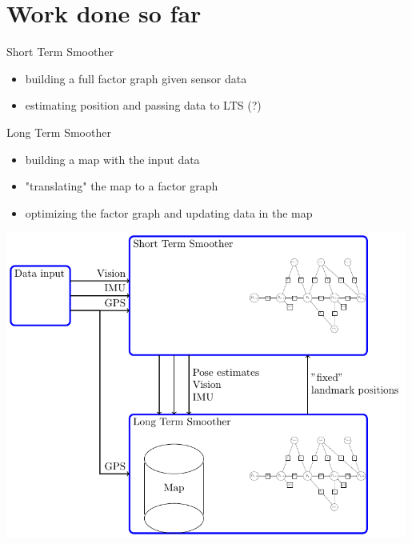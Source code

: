 \documentclass[%
    fourtothree=true, %
    DepLogo=true     %
    ]{ETHpres}
\begin{document}
\section*{Work done so far}
\begin{minipage}{0.4\textwidth}

\footnotesize
	 Short Term Smoother 
		\begin{itemize}
			\item[\ETHitem] building a full factor graph given sensor data
			\item[\ETHitem] estimating position and passing data to LTS (?)
		\end{itemize}
		
\footnotesize		
	 Long Term Smoother
		\begin{itemize}
		 	\item[\ETHitem] building a map with the input data	
		 	\item[\ETHitem] "translating" the map to a factor graph
		 	\item[\ETHitem] optimizing the factor graph and updating data in the map
		\end{itemize}
\end{minipage}
\hspace{0.2cm}
\begin{minipage}{0.59\textwidth}
	\centering
	\includegraphics[width=0.99\textwidth]{TikZ_drawings/STS_and_LTS/STS_and_LTS.pdf}\\
\end{minipage}
\end{document}
